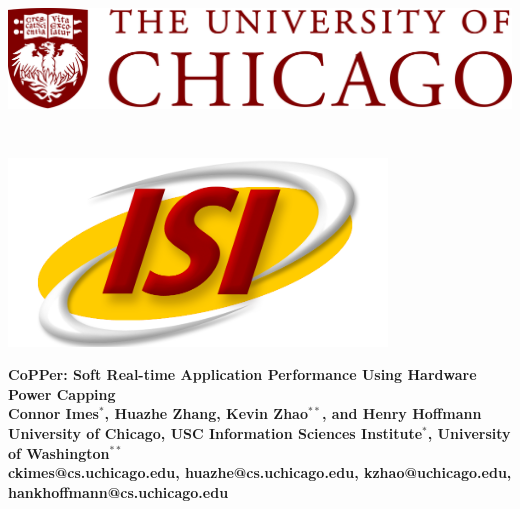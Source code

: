 \documentclass[a0,portrait]{a0poster}
\begin{document}

\begin{minipage}[b]{\linewidth}
\begin{center}
\includegraphics[height=5cm]{figures/uchicago_logo.png} %
\hspace{40cm}
\includegraphics[height=5cm]{figures/isi_logo.png}\\
\vspace{0.25cm}
\noindent\makebox[\linewidth]{\rule{0.9\paperwidth}{0.4pt}}
\vspace{0.25cm}
\end{center}

\Huge \color{NavyBlue} \textbf{CoPPer: Soft Real-time Application Performance Using Hardware Power Capping} \color{Black}\\[0.5cm] %
\huge \textbf{Connor Imes$^*$, Huazhe Zhang, Kevin Zhao$^{**}$, and Henry Hoffmann}\\[0.25cm] %
\LARGE \textbf{University of Chicago, USC Information Sciences Institute$^*$, University of Washington$^{**}$}\\ %
\Large \textbf{ckimes@cs.uchicago.edu, huazhe@cs.uchicago.edu, kzhao@uchicago.edu, hankhoffmann@cs.uchicago.edu}
\end{minipage}
%
\end{document}
